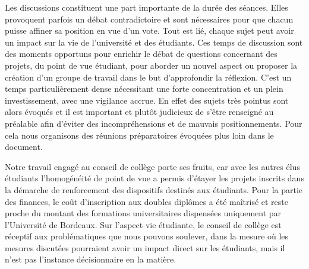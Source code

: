 \documentclass{article}
\begin{document}
Les discussions constituent une part importante de la durée des séances. Elles provoquent parfois un débat contradictoire et sont nécessaires pour que chacun puisse affiner sa position en vue d'un vote. Tout est lié, chaque sujet peut avoir un impact sur la vie de l'université et des étudiants. Ces temps de discussion sont des moments opportuns pour enrichir le débat de questions concernant des projets, du point de vue étudiant, pour aborder un nouvel aspect ou proposer la création d’un groupe de travail dans le but d'approfondir la réflexion. C’est un temps particulièrement dense nécessitant une forte concentration et un plein investissement, avec une vigilance accrue. En effet des sujets très pointus sont alors évoqués et il est important et plutôt judicieux de s'être renseigné au préalable afin d’éviter des incompréhensions et de mauvais positionnements. Pour cela nous organisons des réunions préparatoires évoquées plus loin dans le document.

Notre travail engagé au conseil de collège porte ses fruits, car avec les autres élus étudiants l'homogénéité de point de vue a permis d’étayer les projets inscrits dans la démarche de renforcement des dispositifs destinés aux étudiants. Pour la partie des finances, le coût d'inscription aux doubles diplômes a été maîtrisé et reste proche du montant des formations universitaires dispensées uniquement par l'Université de Bordeaux. Sur l'aspect vie étudiante, le conseil de collège est réceptif aux problématiques que nous pouvons soulever, dans la mesure où les mesures discutées pourraient avoir un impact direct sur les étudiants, mais il n'est pas l'instance décisionnaire en la matière.
\end{document}

